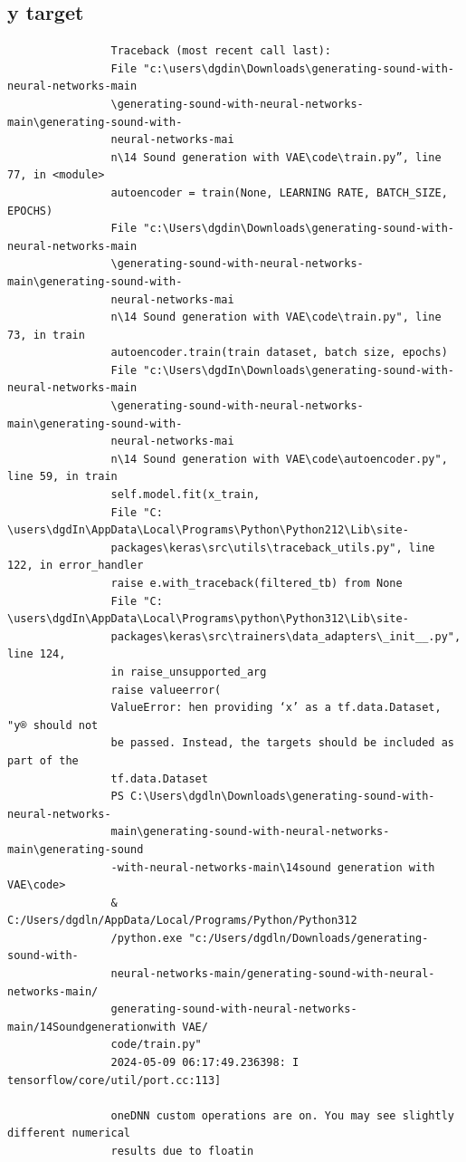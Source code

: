 \documentclass[12pt, a4paper]{article}
\begin{document}
			\subsection{y target}
			\begin{verbatim}
				Traceback (most recent call last): 
				File "c:\users\dgdin\Downloads\generating-sound-with-neural-networks-main
				\generating-sound-with-neural-networks-main\generating-sound-with-
				neural-networks-mai 
				n\14 Sound generation with VAE\code\train.py”, line 77, in <module> 
				autoencoder = train(None, LEARNING RATE, BATCH_SIZE, EPOCHS) 
				File "c:\Users\dgdin\Downloads\generating-sound-with-neural-networks-main
				\generating-sound-with-neural-networks-main\generating-sound-with-
				neural-networks-mai 
				n\14 Sound generation with VAE\code\train.py", line 73, in train 
				autoencoder.train(train dataset, batch size, epochs) 
				File "c:\Users\dgdIn\Downloads\generating-sound-with-neural-networks-main
				\generating-sound-with-neural-networks-main\generating-sound-with-
				neural-networks-mai 
				n\14 Sound generation with VAE\code\autoencoder.py", line 59, in train 
				self.model.fit(x_train, 
				File "C: \users\dgdIn\AppData\Local\Programs\Python\Python212\Lib\site-
				packages\keras\src\utils\traceback_utils.py", line 122, in error_handler 
				raise e.with_traceback(filtered_tb) from None 
				File "C: \users\dgdIn\AppData\Local\Programs\python\Python312\Lib\site-
				packages\keras\src\trainers\data_adapters\_init__.py", line 124, 
				in raise_unsupported_arg 
				raise valueerror( 
				ValueError: hen providing ‘x’ as a tf.data.Dataset, "y® should not
				be passed. Instead, the targets should be included as part of the
				tf.data.Dataset 
				PS C:\Users\dgdln\Downloads\generating-sound-with-neural-networks-
				main\generating-sound-with-neural-networks-main\generating-sound
				-with-neural-networks-main\14sound generation with VAE\code> 
				& C:/Users/dgdln/AppData/Local/Programs/Python/Python312
				/python.exe "c:/Users/dgdln/Downloads/generating-sound-with-
				neural-networks-main/generating-sound-with-neural-networks-main/
				generating-sound-with-neural-networks-main/14Soundgenerationwith VAE/
				code/train.py" 
				2024-05-09 06:17:49.236398: I tensorflow/core/util/port.cc:113]
				
				oneDNN custom operations are on. You may see slightly different numerical 
				results due to floatin 
				

\end{verbatim}
\end{document}
